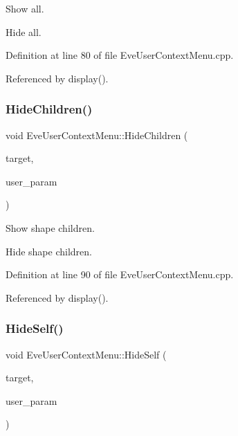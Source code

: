 Show all. 

Hide all. 

Definition at line 80 of file Eve\+User\+Context\+Menu.\+cpp.



Referenced by display().

\hypertarget{class_d_d4hep_1_1_eve_user_context_menu_a3dd44ef5d2c2a19002a584bb3aa0b10e}{}\label{class_d_d4hep_1_1_eve_user_context_menu_a3dd44ef5d2c2a19002a584bb3aa0b10e} 
\subsubsection{\texorpdfstring{Hide\+Children()}{HideChildren()}}
{\footnotesize\ttfamily void Eve\+User\+Context\+Menu\+::\+Hide\+Children (\begin{DoxyParamCaption}\item[{\hyperlink{class_t_object}{T\+Object} $\ast$}]{target,  }\item[{void $\ast$}]{user\+\_\+param }\end{DoxyParamCaption})}



Show shape children. 

Hide shape children. 

Definition at line 90 of file Eve\+User\+Context\+Menu.\+cpp.



Referenced by display().

\hypertarget{class_d_d4hep_1_1_eve_user_context_menu_afdf1b8efe4a72dd81ec77f0b49b36b0c}{}\label{class_d_d4hep_1_1_eve_user_context_menu_afdf1b8efe4a72dd81ec77f0b49b36b0c} 
\subsubsection{\texorpdfstring{Hide\+Self()}{HideSelf()}}
{\footnotesize\ttfamily void Eve\+User\+Context\+Menu\+::\+Hide\+Self (\begin{DoxyParamCaption}\item[{\hyperlink{class_t_object}{T\+Object} $\ast$}]{target,  }\item[{void $\ast$}]{user\+\_\+param }\end{DoxyParamCaption})}



